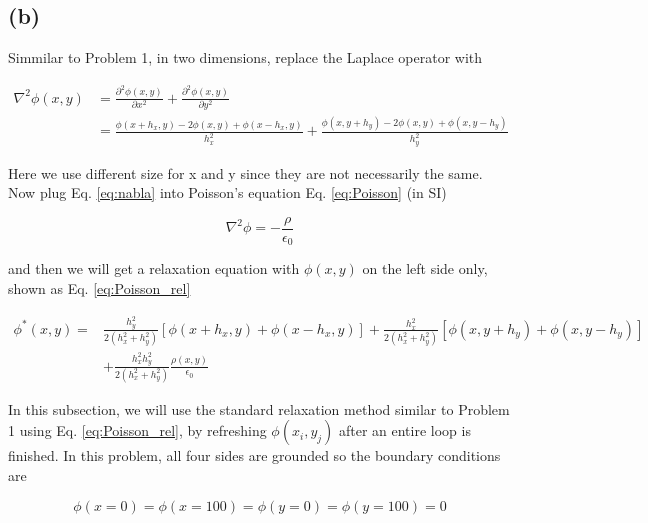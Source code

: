 \documentclass[12pt, graphicx]{article}
\begin{document}
\subsection*{(b)}
Simmilar to Problem 1, in two dimensions, replace the Laplace operator with 

\begin{equation}
\begin{aligned}
\nabla^2\phi(x,y)&=\frac{\partial^2\phi(x,y)}{\partial x^2}+\frac{\partial^2\phi(x,y)}{\partial y^2}\\&=\frac{\phi(x+h_x,y)-2\phi(x,y)+\phi(x-h_x,y)}{h_x^2}+\frac{\phi(x,y+h_y)-2\phi(x,y)+\phi(x,y-h_y)}{h_y^2}
\end{aligned}
\label{eq:nabla}
\end{equation}

Here we use different size for x and y since they are not necessarily the same. Now plug Eq. \ref{eq:nabla} into Poisson's equation Eq. \ref{eq:Poisson} (in SI)

\begin{equation}
\nabla^2\phi=-\frac{\rho}{\epsilon_0}
\label{eq:Poisson}
\end{equation}

and then we will get a relaxation equation with $\phi(x,y)$ on the left side only, shown as Eq. \ref{eq:Poisson_rel} 

\begin{equation}
\begin{aligned}
\phi^*(x,y)=&\frac{h_y^2}{2(h_x^2+h_y^2)}[\phi(x+h_x,y)+\phi(x-h_x,y)]+\frac{h_x^2}{2(h_x^2+h_y^2)}[\phi(x,y+h_y)+\phi(x,y-h_y)]\\
&+\frac{h_x^2h_y^2}{2(h_x^2+h_y^2)}\frac{\rho(x,y)}{\epsilon_0}
\end{aligned}
\label{eq:Poisson_rel}
\end{equation}

In this subsection, we will use the standard relaxation method similar to Problem 1 using Eq. \ref{eq:Poisson_rel}, by refreshing $\phi(x_i,y_j)$ after an entire loop is finished. In this problem, all four sides are grounded so the boundary conditions are 

\begin{equation}
\phi(x=0)=\phi(x=100)=\phi(y=0)=\phi(y=100)=0
\label{eq:BC}
\end{equation}
\end{document}
